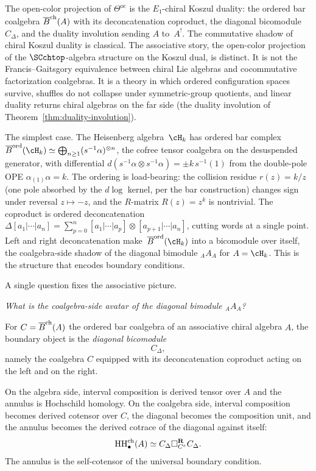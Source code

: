 The open-color projection of $\Theta^{\mathrm{oc}}$ is the
$E_1$-chiral Koszul duality: the ordered bar coalgebra $\overline{B}^{\mathrm{ch}}(A)$
with its deconcatenation coproduct, the diagonal bicomodule
$C_\Delta$, and the duality involution sending $A$ to~$A^!$. The
commutative shadow of chiral Koszul duality is classical. The
associative story, the open-color projection of the
$\SCchtop$-algebra structure on the Koszul dual, is distinct. It is
not the Francis--Gaitsgory equivalence between chiral Lie algebras
and cocommutative factorization coalgebras. It is a theory in which
ordered configuration spaces survive, shuffles do not collapse under
symmetric-group quotients, and linear duality returns chiral
algebras on the far side (the duality involution of
Theorem~\ref{thm:duality-involution}).

The simplest case. The Heisenberg algebra~$\cH_k$
has ordered bar complex
$\Barchord(\cH_k)\simeq\bigoplus_{n\ge 1}
(s^{-1}\alpha)^{\otimes n}$, the cofree tensor coalgebra on the
desuspended generator, with differential
$d(s^{-1}\alpha\otimes s^{-1}\alpha)=\pm k\,s^{-1}(1)$
from the double-pole OPE
$\alpha_{(1)}\alpha=k$. The ordering is load-bearing:
the collision residue $r(z)=k/z$ (one pole absorbed by the
$d\log$ kernel, per the bar construction) changes sign under
reversal $z\mapsto -z$, and the $R$-matrix $R(z)=z^k$ is
nontrivial. The coproduct is ordered deconcatenation
$\Delta[a_1|\cdots|a_n]=\sum_{p=0}^{n}
[a_1|\cdots|a_p]\otimes[a_{p+1}|\cdots|a_n]$,
cutting words at a single point. Left and right
deconcatenation make~$\Barchord(\cH_k)$
into a bicomodule over itself, the coalgebra-side shadow of
the diagonal bimodule ${}_A A_A$ for $A=\cH_k$. This is
the structure that encodes boundary conditions.

A single question fixes the associative picture.

\medskip

\emph{What is the coalgebra-side avatar of the diagonal bimodule ${}_A A_A$?}

\medskip

For $C=\overline{B}^{\mathrm{ch}}(A)$ the ordered bar coalgebra of an associative chiral
algebra $A$, the boundary object is the \emph{diagonal bicomodule}
\[
C_\Delta,
\]
namely the coalgebra $C$ equipped with its deconcatenation coproduct acting on the left and on the right.

On the algebra side, interval composition is derived tensor over $A$ and the annulus is Hochschild
homology. On the coalgebra side, interval composition becomes derived cotensor over $C$, the
diagonal becomes the composition unit, and the annulus becomes the derived cotrace of the diagonal
against itself:
\[
\operatorname{HH}^{\mathrm{ch}}_\bullet(A)\simeq C_\Delta \square_{C^e}^{\mathbf R} C_\Delta.
\]
The annulus is the self-cotensor of the universal boundary condition.

